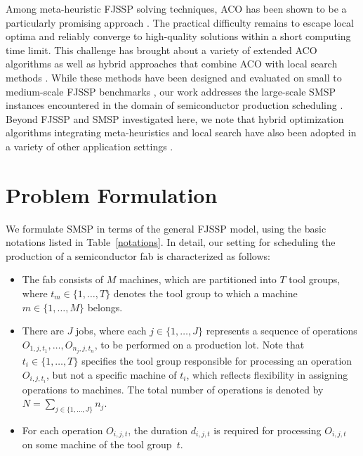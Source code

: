 \documentclass[runningheads]{llncs}
\begin{document}
Among meta-heuristic FJSSP solving techniques,
ACO has been shown to be a particularly promising approach \cite{turkyilmaz2020research}.
The practical difficulty remains to escape local optima and reliably
converge to high-quality solutions within a short computing time limit.
This challenge has brought about a variety of extended ACO algorithms as well as
hybrid approaches that combine ACO with local search methods
\cite{leung2010integrated,li2010improved,xing2010knowledge,thammano2013hybrid,arnaout2014two,el2017dual}.
While these methods have been designed and evaluated
on small to medium-scale FJSSP benchmarks \cite{arnaout2014two},
our work addresses the large-scale SMSP instances encountered in
the domain of semiconductor production scheduling \cite{kopp2020smt2020}.
Beyond FJSSP and SMSP investigated here,
we note that hybrid optimization algorithms integrating meta-heuristics and
local search have also been adopted in a variety of other application settings
\cite{abdel2021hybrid,fontes2023hybrid,li2021hybrid,mohd2023improved,suid2023novel}.


\section{Problem Formulation}
\label{sec:problem_f}

We formulate SMSP in terms of the general FJSSP model,
using the basic notations listed in Table~\ref{notations}. 
In detail, our setting for scheduling the production of a semiconductor fab is characterized as follows:

\begin{itemize}
	\item The fab consists of $M$ machines, which are partitioned into $T$
	tool groups, where $t_m\in\{1,\dots,T\}$ denotes the tool group
	to which a machine $m\in\{1,\dots,M\}$ belongs.
	\item There are $J$ jobs, where each $j\in\{1,\dots,J\}$ represents a
	sequence of operations $O_{1,j,t_1},\dots,O_{n_j,j,t_n}$, to be performed on a production lot.
	Note that $t_i\in\{1,\dots,T\}$ specifies the tool group 
	responsible for processing an operation $O_{i,j,t_i}$, %
	but not a specific machine of $t_i$,
	which reflects flexibility in assigning operations to machines.
	The total number of operations is denoted by
	$N = \sum_{j\in\{1,\dots,J\}}n_j$.
	\item For each operation $O_{i,j,t}$,
	the duration $d_{i,j,t}$ is required for processing $O_{i,j,t}$
	on some machine of the tool group~$t$.
\end{itemize}
\end{document}
